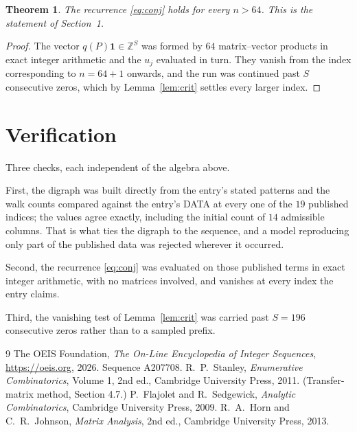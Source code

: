 \documentclass[11pt,a4paper]{article}
\theoremstyle{plain}
\newtheorem{theorem}{Theorem}
\theoremstyle{definition}
\begin{document}
\begin{theorem}
The recurrence \eqref{eq:conj} holds for every $n>64$. This is the statement of
Section~1.
\end{theorem}

\begin{proof}
The vector $q(P)\mathbf{1}\in\mathbb{Z}^{S}$ was formed by $64$ matrix--vector
products in exact integer arithmetic and the $u_j$ evaluated in turn. They vanish from the
index corresponding to $n=64+1$ onwards, and the run was continued past $S$ consecutive
zeros, which by Lemma~\ref{lem:crit} settles every larger index.
\end{proof}

\section{Verification}

Three checks, each independent of the algebra above.

First, the digraph was built directly from the entry's stated patterns and the walk counts
compared against the entry's DATA at every one of the $19$ published indices; the
values agree exactly, including the initial count of $14$ admissible columns. That is
what ties the digraph to the sequence, and a model reproducing only part of the published
data was rejected wherever it occurred.

Second, the recurrence \eqref{eq:conj} was evaluated on those published terms in exact
integer arithmetic, with no matrices involved, and vanishes at every index the entry claims.

Third, the vanishing test of Lemma~\ref{lem:crit} was carried past $S=196$ consecutive
zeros rather than to a sampled prefix.

\begin{thebibliography}{9}
 The OEIS Foundation, \emph{The On-Line Encyclopedia of Integer
Sequences}, \url{https://oeis.org}, 2026. Sequence A207708.
 R.~P.~Stanley, \emph{Enumerative Combinatorics}, Volume 1, 2nd ed.,
Cambridge University Press, 2011. (Transfer-matrix method, Section 4.7.)
 P.~Flajolet and R.~Sedgewick, \emph{Analytic Combinatorics}, Cambridge
University Press, 2009.
 R.~A.~Horn and C.~R.~Johnson, \emph{Matrix Analysis}, 2nd ed., Cambridge
University Press, 2013.
\end{thebibliography}
\end{document}
